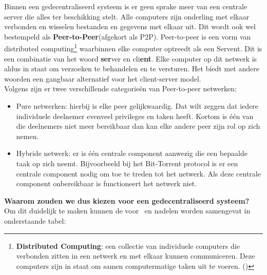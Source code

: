 Binnen een gedecentraliseerd systeem is er geen sprake meer van een centrale server die alles ter beschikking stelt. Alle computers zijn onderling met elkaar verbonden en wisselen bestanden en gegevens met elkaar uit. Dit wordt ook wel bestempeld als \textbf{Peer-to-Peer}(afgekort als P2P). Peer-to-peer is een vorm van distributed computing\footnote{\textbf{Distributed Computing}: een collectie van individuele computers die verbonden zitten in een netwerk en met elkaar kunnen communiceren. Deze computers zijn in staat om samen computermatige taken uit te voeren. (\autocite{Attiya2004})} waarbinnen elke computer optreedt als een Servent. Dit is een combinatie van het woord \textbf{ser}ver en cli\textbf{ent}. Elke computer op dit netwerk is aldus in staat om verzoeken te behandelen en te versturen. Het biedt met andere woorden een gangbaar alternatief voor het client-server model. \\
 
Volgens \textcite{Schollmeier2001} zijn er  twee verschillende categorieën van Peer-to-peer netwerken:

\begin{itemize}
\item Pure netwerken: hierbij is elke peer gelijkwaardig. Dat wilt zeggen dat iedere individuele deelnemer evenveel privileges en taken heeft. Kortom is één van die deelnemers niet meer bereikbaar dan kan elke andere peer zijn rol op zich nemen.\\
\item Hybride netwerk: er is één centrale component aanwezig die een bepaalde taak op zich neemt. Bijvoorbeeld bij het Bit-Torrent protocol is er een centrale component nodig om toe te treden tot het netwerk. Als deze centrale component onbereikbaar is functioneert het netwerk niet.\\
\end{itemize}


\textbf{Waarom zouden we dus kiezen voor een gedecentraliseerd systeem?} Om dit duidelijk te maken kunnen de voor~ en nadelen worden samengevat in onderstaande tabel:\\

